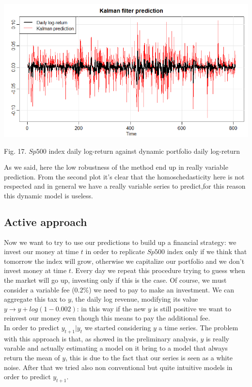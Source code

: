 \documentclass{article}%
\begin{document}
  
\includegraphics[scale=0.55]{kalmanprediction}
\begin{center}
\begin{small}
Fig. 17. $Sp500$ index daily log-return against dynamic portfolio daily log-return
\\

\end{small}
\end{center}
       

As we said, here the low robustness of the method end up in really variable prediction. From the second plot it's clear that the homoschedasticity here is not respected and in general we have a really variable series to predict,for this reason this dynamic model is useless.

\subsection{Active approach}
Now we want to try to use our predictions to build up a financial strategy: we invest our money at time $t$  in order to replicate $Sp500$ index only if we think that tomorrow the index will grow, otherwise we capitalize our portfolio and we don't invest money at time $t$. Every day we repeat this procedure trying to guess when the market will go up, investing only if this is the case.  Of course, we must consider a variable fee ($0.2\%$) we need to pay to make an investment.  We can aggregate this tax
to $y$, the daily log revenue, modifying its value $y\rightarrow y+log(1-0.002)$: in this way if the new $y$ is still positive we want to reinvest our money even though this means to pay the additional fee.
\\

In order to predict $y_{t+1}|y_t$ we started considering $y$ a time series. The problem with this approach is that, as showed in the preliminary analysis, $y$ is really varable and actually estimating a model on it bring to a model that always return the mean of $y$, this is due to the fact that our series is seen as a white noise. After that we tried also non conventional but quite intuitive models in order to predict $y_{t+1}$.
\end{document}
